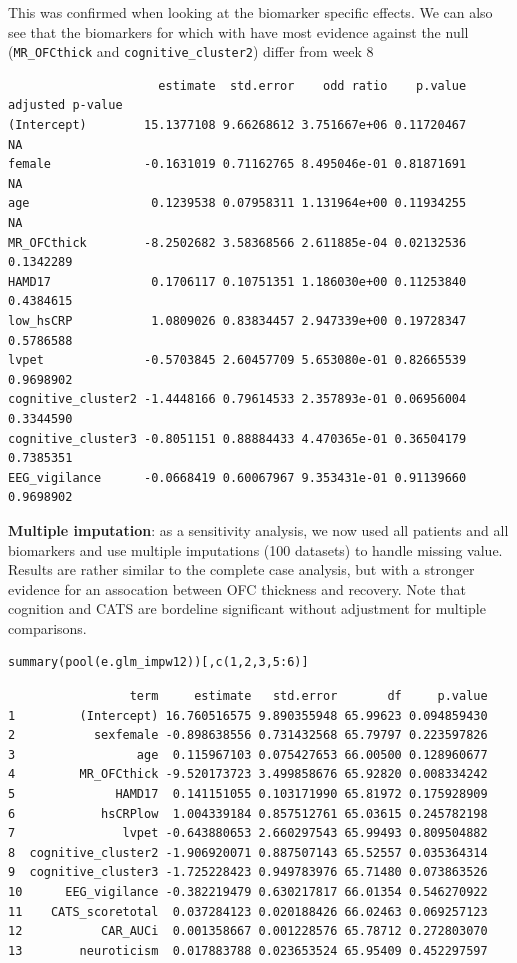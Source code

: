 \documentclass[12pt]{article}
\begin{document}
This was confirmed when looking at the biomarker specific effects. We
can also see that the biomarkers for which with have most evidence
against the null (\texttt{MR\_OFCthick} and \texttt{cognitive\_cluster2}) differ from
week 8
\begin{verbatim}
                     estimate  std.error    odd ratio    p.value adjusted p-value
(Intercept)        15.1377108 9.66268612 3.751667e+06 0.11720467               NA
female             -0.1631019 0.71162765 8.495046e-01 0.81871691               NA
age                 0.1239538 0.07958311 1.131964e+00 0.11934255               NA
MR_OFCthick        -8.2502682 3.58368566 2.611885e-04 0.02132536        0.1342289
HAMD17              0.1706117 0.10751351 1.186030e+00 0.11253840        0.4384615
low_hsCRP           1.0809026 0.83834457 2.947339e+00 0.19728347        0.5786588
lvpet              -0.5703845 2.60457709 5.653080e-01 0.82665539        0.9698902
cognitive_cluster2 -1.4448166 0.79614533 2.357893e-01 0.06956004        0.3344590
cognitive_cluster3 -0.8051151 0.88884433 4.470365e-01 0.36504179        0.7385351
EEG_vigilance      -0.0668419 0.60067967 9.353431e-01 0.91139660        0.9698902
\end{verbatim}

\textbf{Multiple imputation}: as a sensitivity analysis, we now used all
patients and all biomarkers and use multiple imputations (100
datasets) to handle missing value. Results are rather similar to the
complete case analysis, but with a stronger evidence for an assocation
between OFC thickness and recovery. Note that cognition and CATS are
bordeline significant without adjustment for multiple comparisons.
\lstset{language=r,label= ,caption= ,captionpos=b,numbers=none}
\begin{lstlisting}
summary(pool(e.glm_impw12))[,c(1,2,3,5:6)]
\end{lstlisting}

\begin{verbatim}
                 term     estimate   std.error       df     p.value
1         (Intercept) 16.760516575 9.890355948 65.99623 0.094859430
2           sexfemale -0.898638556 0.731432568 65.79797 0.223597826
3                 age  0.115967103 0.075427653 66.00500 0.128960677
4         MR_OFCthick -9.520173723 3.499858676 65.92820 0.008334242
5              HAMD17  0.141151055 0.103171990 65.81972 0.175928909
6            hsCRPlow  1.004339184 0.857512761 65.03615 0.245782198
7               lvpet -0.643880653 2.660297543 65.99493 0.809504882
8  cognitive_cluster2 -1.906920071 0.887507143 65.52557 0.035364314
9  cognitive_cluster3 -1.725228423 0.949783976 65.71480 0.073863526
10      EEG_vigilance -0.382219479 0.630217817 66.01354 0.546270922
11    CATS_scoretotal  0.037284123 0.020188426 66.02463 0.069257123
12           CAR_AUCi  0.001358667 0.001228576 65.78712 0.272803070
13        neuroticism  0.017883788 0.023653524 65.95409 0.452297597
\end{verbatim}
\end{document}
